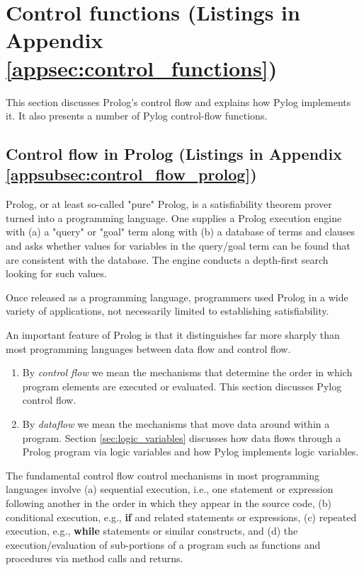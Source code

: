 \section{Control functions (Listings in Appendix \ref{appsec:control_functions})} \label{sec:control_functions}  %

This section discusses Prolog's control flow and explains how Pylog implements it. It also presents a number of Pylog control-flow functions.

\subsection{Control flow in Prolog (Listings in Appendix \ref{appsubsec:control_flow_prolog})} \label{subsec:control_flow_prolog}

Prolog, or at least so-called "pure" Prolog, is a satisfiability theorem prover turned into a programming language. One supplies a Prolog execution engine with (a) a "query" or "goal" term along with (b) a database of terms and clauses and asks whether values for variables in the query/goal term can be found that are consistent with the database. The engine conducts a depth-first search looking for such values. 

Once released as a programming language, programmers used Prolog in a wide variety of applications, not necessarily limited to establishing satisfiability. 

An important feature of Prolog is that it distinguishes far more sharply than most programming languages between data flow and control flow. 
\begin{enumerate}
    \item By \textit{control flow} we mean the mechanisms that determine the order in which program elements are executed or evaluated. This section discusses Pylog control flow.

    \item By \textit{dataflow} we mean the mechanisms that move data around within a program. Section \ref{sec:logic_variables} discusses how data flows through a Prolog program via logic variables and how Pylog implements logic variables.
\end{enumerate}

The fundamental control flow control mechanisms in most programming languages involve (a) sequential execution, i.e., one statement or expression following another in the order in which they appear in the source code, (b) conditional execution, e.g., \textbf{if} and related statements or expressions, (c) repeated execution, e.g., \textbf{while} statements or similar constructs, and (d) the execution/evaluation of sub-portions of a program such as functions and procedures via method calls and returns. 

